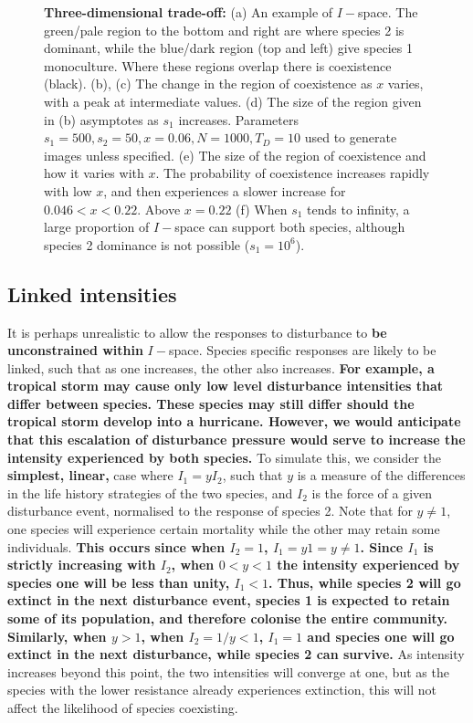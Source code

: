 \documentclass[preprint,10pt,reqno]{report}
\begin{document}
\begin{figure}[htbp]
\begin{tabular}{rrrr}
\end{tabular}
\caption{\textbf{Three-dimensional trade-off:} (a) An example of $I-$space. The green/pale region to the bottom and right are where species 2 is dominant, while the blue/dark region (top and left) give species 1 monoculture. Where these regions overlap there is coexistence (black). (b),  (c) The change in the region of coexistence as $x$ varies, with a peak at intermediate values. (d) The size of the region given in (b) asymptotes as $s_1$ increases. Parameters $s_1=500,s_2=50,x=0.06,N=1000,T_D=10$ used to generate images unless specified. (e) The size of the region of coexistence and how it varies with $x$. The probability of coexistence increases rapidly with low $x$, and then experiences a slower increase for $0.046<x<0.22$. Above $x=0.22$ (f) When $s_1$ tends to infinity, a large proportion of $I-$space can support both species, although species 2 dominance is not possible ($s_1=10^6$).}
\label{full}
\end{figure}

\subsection{Linked intensities}
It is perhaps unrealistic to allow the responses to disturbance to \textbf{ be unconstrained within} $I-$space. Species specific responses are likely to be linked, such that as one increases, the other also increases. \textbf{For example, a tropical storm may cause only low level disturbance intensities that differ between species. These species may still differ should the tropical storm develop into a hurricane. However, we would anticipate that this escalation of disturbance pressure would serve to increase the intensity experienced by both species.} To simulate this, we consider the \textbf{simplest, linear,} case where $I_1=yI_2$, such that $y$ is a measure of the differences in the life history strategies of the two species, and $I_2$ is the force of a given disturbance event, normalised to the response of species 2. Note that for $y\neq 1$, one species will experience certain mortality while the other may retain some individuals.\textbf{ This occurs since when $I_2=1$, $I_1=y1=y\neq1$. Since $I_1$ is strictly increasing with $I_2$, when $0<y<1$ the intensity experienced by species one will be less than unity, $I_1<1$. Thus, while species 2 will go extinct in the next disturbance event, species 1 is expected to retain some of its population, and therefore colonise the entire community. Similarly, when $y>1$, when $I_2=1/y <1$, $I_1=1$ and species one will go extinct in the next disturbance, while species 2 can survive.} As intensity increases beyond this point, the two intensities will converge at one, but as the species with the lower resistance already experiences extinction, this will not affect the likelihood of species coexisting.
\end{document}
